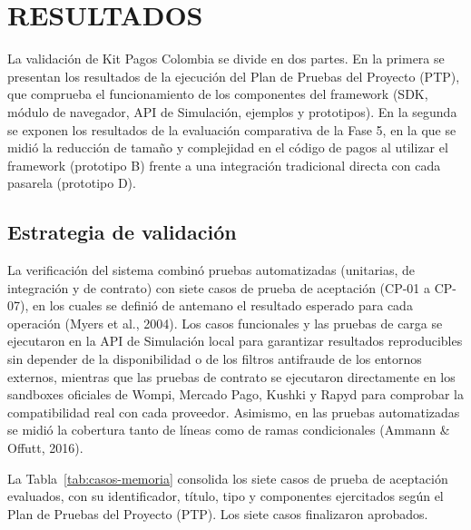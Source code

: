 \setcounter{subsection}{0}
\section{RESULTADOS}

La validación de Kit Pagos Colombia se divide en dos partes. En la primera se presentan los resultados de la ejecución del Plan de Pruebas del Proyecto (PTP), que comprueba el funcionamiento de los componentes del framework (SDK, módulo de navegador, API de Simulación, ejemplos y prototipos). En la segunda se exponen los resultados de la evaluación comparativa de la Fase 5, en la que se midió la reducción de tamaño y complejidad en el código de pagos al utilizar el framework (prototipo B) frente a una integración tradicional directa con cada pasarela (prototipo D).

\subsection{Estrategia de validación}
\label{sec:vii-estrategia}

La verificación del sistema combinó pruebas automatizadas (unitarias, de integración y de contrato) con siete casos de prueba de aceptación (CP-01 a CP-07), en los cuales se definió de antemano el resultado esperado para cada operación (Myers et al., 2004). Los casos funcionales y las pruebas de carga se ejecutaron en la API de Simulación local para garantizar resultados reproducibles sin depender de la disponibilidad o de los filtros antifraude de los entornos externos, mientras que las pruebas de contrato se ejecutaron directamente en los sandboxes oficiales de Wompi, Mercado Pago, Kushki y Rapyd para comprobar la compatibilidad real con cada proveedor. Asimismo, en las pruebas automatizadas se midió la cobertura tanto de líneas como de ramas condicionales (Ammann \& Offutt, 2016).

La Tabla~\ref{tab:casos-memoria} consolida los siete casos de prueba de aceptación evaluados, con su identificador, título, tipo y componentes ejercitados según el Plan de Pruebas del Proyecto (PTP). Los siete casos finalizaron aprobados.

